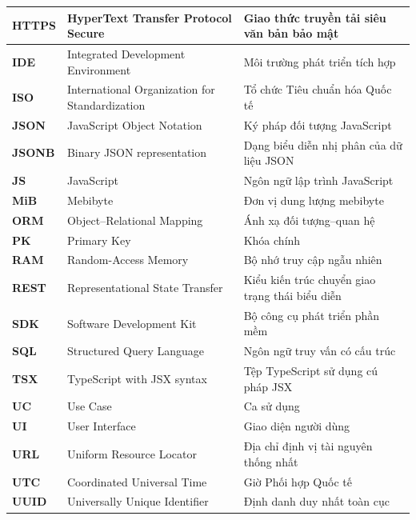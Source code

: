 \documentclass[../DoAn.tex]{subfiles}
\begin{document}
\begin{longtable}{|>{\centering\arraybackslash}p{1.8cm}|p{5.6cm}|p{6.1cm}|}
    \textbf{HTTPS} & HyperText Transfer Protocol Secure & Giao thức truyền tải siêu văn bản bảo mật \\ \hline
    \textbf{IDE} & Integrated Development Environment & Môi trường phát triển tích hợp \\ \hline
    \textbf{ISO} & International Organization for Standardization & Tổ chức Tiêu chuẩn hóa Quốc tế \\ \hline
    \textbf{JSON} & JavaScript Object Notation & Ký pháp đối tượng JavaScript \\ \hline
    \textbf{JSONB} & Binary JSON representation & Dạng biểu diễn nhị phân của dữ liệu JSON \\ \hline
    \textbf{JS} & JavaScript & Ngôn ngữ lập trình JavaScript \\ \hline
    \textbf{MiB} & Mebibyte & Đơn vị dung lượng mebibyte \\ \hline
    \textbf{ORM} & Object--Relational Mapping & Ánh xạ đối tượng--quan hệ \\ \hline
    \textbf{PK} & Primary Key & Khóa chính \\ \hline
    \textbf{RAM} & Random-Access Memory & Bộ nhớ truy cập ngẫu nhiên \\ \hline
    \textbf{REST} & Representational State Transfer & Kiểu kiến trúc chuyển giao trạng thái biểu diễn \\ \hline
    \textbf{SDK} & Software Development Kit & Bộ công cụ phát triển phần mềm \\ \hline
    \textbf{SQL} & Structured Query Language & Ngôn ngữ truy vấn có cấu trúc \\ \hline
    \textbf{TSX} & TypeScript with JSX syntax & Tệp TypeScript sử dụng cú pháp JSX \\ \hline
    \textbf{UC} & Use Case & Ca sử dụng \\ \hline
    \textbf{UI} & User Interface & Giao diện người dùng \\ \hline
    \textbf{URL} & Uniform Resource Locator & Địa chỉ định vị tài nguyên thống nhất \\ \hline
    \textbf{UTC} & Coordinated Universal Time & Giờ Phối hợp Quốc tế \\ \hline
    \textbf{UUID} & Universally Unique Identifier & Định danh duy nhất toàn cục \\ \hline
\end{longtable}
\endgroup
\end{document}
